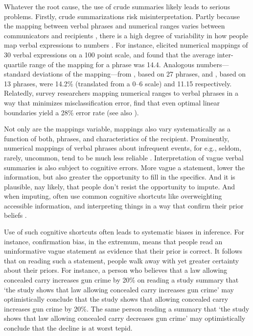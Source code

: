 \documentclass[12pt]{article}
\begin{document}
Whatever the root cause, the use of crude summaries likely leads to serious problems. Firstly, crude summarizations risk misinterpretation. Partly because the mapping between verbal phrases and numerical ranges varies between communicators and recipients \citep{capriotti2011miscommunication}, there is a high degree of variability in how people map verbal expressions to numbers \citep{beyth1982probable, bocklisch2010role, brun1988verbal, simpson1944specific, simpson1963stability}. For instance, \citet{beyth1982probable} elicited numerical mappings of 30 verbal expressions on a 100 point scale, and found that the average inter-quartile range of the mapping for a phrase was 14.4. Analogous numbers---standard deviations of the mapping---from \citet{brun1988verbal}, based on 27 phrases, and \citet{bocklisch2010role}, based on 13 phrases, were 14.2\% (translated from a 0--6 scale) and 11.15 respectively. Relatedly, survey researchers mapping numerical ranges to verbal phrases in a way that minimizes misclassification error, find that even optimal linear boundaries yield a 28\% error rate \citep{elsaesser2013much} (see also \citet{bocklisch2010role}). 

Not only are the mappings variable, mappings also vary systematically as a function of both, phrases, and characteristics of the recipient. Prominently, numerical mappings of verbal phrases about infrequent events, for e.g., seldom, rarely, uncommon, tend to be much less reliable \citep{wallsten1986base}. Interpretation of vague verbal summaries is also subject to cognitive errors. More vague a statement, lower the information, but also greater the opportunity to fill in the specifics. And it is plausible, nay likely, that people don't resist the opportunity to impute. And when imputing, often use common cognitive shortcuts like overweighting accessible information, and interpreting things in a way that confirm their prior beliefs \citep{nickerson1998confirmation, tomz2009electoral, brun1988verbal, wright1994much}.

Use of such cognitive shortcuts often leads to systematic biases in inference. For instance, confirmation bias, in the extremum, means that people read an uninformative vague statement as evidence that their prior is correct. It follows that on reading such a statement, people walk away with yet greater certainty about their priors.  For instance, a person who believes that a law allowing concealed carry increases gun crime by 20\% on reading a study summary that `the study shows that law allowing concealed carry increases gun crime' may optimistically conclude that the study shows that allowing concealed carry increases gun crime by 20\%. The same person reading a summary that `the study shows that law allowing concealed carry decreases gun crime' may optimistically conclude that the decline is at worst tepid. 
\end{document}
